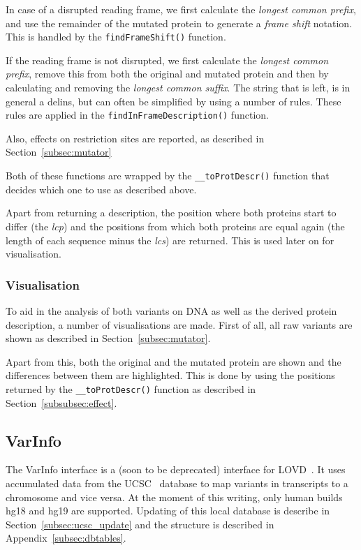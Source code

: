 \documentclass{article}
\begin{document}
In case of a disrupted reading frame, we first calculate the \emph{longest
common prefix}, and use the remainder of the mutated protein to generate
a \emph{frame shift} notation. This is handled by the \texttt{findFrameShift()}
function.

If the reading frame is not disrupted, we first calculate the \emph{longest
common prefix}, remove this from both the original and mutated protein and then
by calculating and removing the \emph{longest common suffix}. The string that
is left, is in general a delins, but can often be simplified by using a number
of rules. These rules are applied in the \texttt{findInFrameDescription()} 
function.

Also, effects on restriction sites are reported, as described in 
Section~\ref{subsec:mutator}

Both of these functions are wrapped by the \texttt{\_\_toProtDescr()} function
that decides which one to use as described above.

Apart from returning a description, the position where both proteins start
to differ (the \emph{lcp}) and the positions from which both proteins are equal
again (the length of each sequence minus the \emph{lcs}) are returned. This is
used later on for visualisation.

\subsubsection{Visualisation} \label{subsubsec:visualisation}
To aid in the analysis of both variants on DNA as well as the derived protein
description, a number of visualisations are made. First of all, all raw
variants are shown as described in Section~\ref{subsec:mutator}. 

Apart from this, both the original and the mutated protein are shown and the
differences between them are highlighted. This is done by using the positions
returned by the \texttt{\_\_toProtDescr()} function as described in 
Section~\ref{subsubsec:effect}.

\subsection{VarInfo} \label{subsec:varinfo}
The VarInfo interface is a (soon to be deprecated) interface for
LOVD~\cite{LOVDD}. It uses accumulated data from the UCSC~\cite{UCSC} database
to map variants in transcripts to a chromosome and vice versa. At the moment of
this writing, only human builds hg18 and hg19 are supported. Updating of this
local database is describe in Section~\ref{subsec:ucsc_update} and the
structure is described in Appendix~\ref{subsec:dbtables}.
\end{document}
